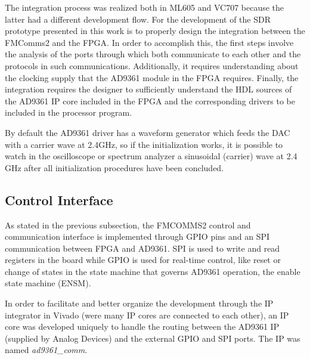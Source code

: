 The integration process was realized both in ML605 and VC707 because the latter
had a different development flow. For the development of the SDR prototype
presented in this work is to properly design the integration between the
FMComms2 and the FPGA. In order to accomplish this, the first steps involve the
analysis of the ports through which both communicate to each other and the
protocols in such communications. Additionally, it requires understanding about
the clocking supply that the AD9361 module in the FPGA requires. Finally, the
integration requires the designer to sufficiently understand the HDL sources of
the AD9361 IP core included in the FPGA and the corresponding drivers to be
included in the processor program.


By default the AD9361 driver has a waveform generator which feeds the DAC with a
carrier wave at 2.4GHz, so if the initialization works, it is possible to watch
in the oscilloscope or spectrum analyzer a sinusoidal (carrier) wave at 2.4 GHz
after all initialization procedures have been concluded.

\subsection{Control Interface}
\label{subs:controlif}

As stated in the previous subsection, the FMCOMMS2 control and communication
interface is implemented through GPIO pins and an SPI communication between FPGA
and AD9361. SPI is used to write and read registers in the board while GPIO is
used for real-time control, like reset or change of states in the state machine
that governs AD9361 operation, the enable state machine (ENSM).


In order to facilitate and better organize the development through the IP
integrator in Vivado (were many IP cores are connected to each other), an IP
core was developed uniquely to handle the routing between the AD9361 IP
(supplied by Analog Devices) and the external GPIO and SPI ports. The IP was
named \emph{ad9361\_comm}.


